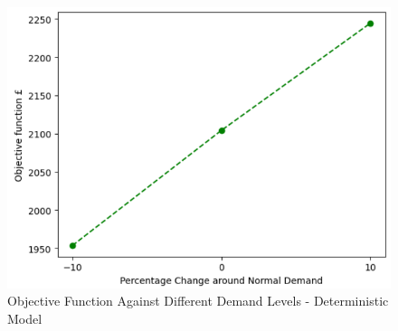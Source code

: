 \documentclass[../thesis.tex]{subfiles}
\begin{document}
{\begin{figure}[h!]
    \centering
    \includegraphics[scale=0.8]{Chapters/Chapter4New/Figures/WEDeterministicFinal.png}
    \caption{Objective Function Against Different Demand Levels - Deterministic Model}
    \label{fig:WEDeterministic}
\end{figure}

}
\end{document}
